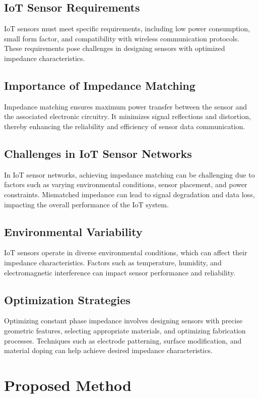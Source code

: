 \documentclass[12pt]{report}
\begin{document}
\subsection*{IoT Sensor Requirements} IoT sensors must meet specific requirements, including low power consumption, small form factor, and compatibility with wireless communication protocols. These requirements pose challenges in designing sensors with optimized impedance characteristics.\cite{internet}
\subsection*{Importance of Impedance Matching} Impedance matching ensures maximum power transfer between the sensor and the associated electronic circuitry. It minimizes signal reflections and distortion, thereby enhancing the reliability and efficiency of sensor data communication.
\subsection*{Challenges in IoT Sensor Networks} In IoT sensor networks, achieving impedance matching can be challenging\cite{security} due to factors such as varying environmental conditions, sensor placement, and power constraints. Mismatched impedance can lead to signal degradation and data loss, impacting the overall performance of the IoT system.
\subsection*{Environmental Variability} IoT sensors operate in diverse environmental conditions, which can affect their impedance characteristics. Factors such as temperature, humidity, and electromagnetic interference can impact sensor performance and reliability.
\subsection*{Optimization Strategies} Optimizing constant phase impedance involves designing sensors with precise geometric features, selecting appropriate materials, and optimizing fabrication processes. Techniques such as electrode patterning, surface modification, and material doping can help achieve desired impedance characteristics.



\newpage
\section*{Proposed Method}
\end{document}
